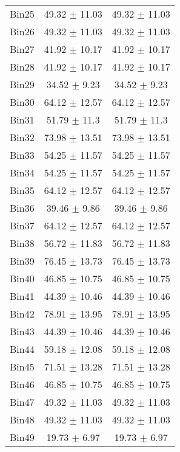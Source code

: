 \begin{tabular}{|c|c|c|}
     Bin25 & 49.32 $\pm$ 11.03 & 49.32 $\pm$ 11.03 \\ \cline{1-3} 
     Bin26 & 49.32 $\pm$ 11.03 & 49.32 $\pm$ 11.03 \\ \cline{1-3} 
     Bin27 & 41.92 $\pm$ 10.17 & 41.92 $\pm$ 10.17 \\ \cline{1-3} 
     Bin28 & 41.92 $\pm$ 10.17 & 41.92 $\pm$ 10.17 \\ \cline{1-3} 
     Bin29 & 34.52 $\pm$ 9.23 & 34.52 $\pm$ 9.23 \\ \cline{1-3} 
     Bin30 & 64.12 $\pm$ 12.57 & 64.12 $\pm$ 12.57 \\ \cline{1-3} 
     Bin31 & 51.79 $\pm$ 11.3 & 51.79 $\pm$ 11.3 \\ \cline{1-3} 
     Bin32 & 73.98 $\pm$ 13.51 & 73.98 $\pm$ 13.51 \\ \cline{1-3} 
     Bin33 & 54.25 $\pm$ 11.57 & 54.25 $\pm$ 11.57 \\ \cline{1-3} 
     Bin34 & 54.25 $\pm$ 11.57 & 54.25 $\pm$ 11.57 \\ \cline{1-3} 
     Bin35 & 64.12 $\pm$ 12.57 & 64.12 $\pm$ 12.57 \\ \cline{1-3} 
     Bin36 & 39.46 $\pm$ 9.86 & 39.46 $\pm$ 9.86 \\ \cline{1-3} 
     Bin37 & 64.12 $\pm$ 12.57 & 64.12 $\pm$ 12.57 \\ \cline{1-3} 
     Bin38 & 56.72 $\pm$ 11.83 & 56.72 $\pm$ 11.83 \\ \cline{1-3} 
     Bin39 & 76.45 $\pm$ 13.73 & 76.45 $\pm$ 13.73 \\ \cline{1-3} 
     Bin40 & 46.85 $\pm$ 10.75 & 46.85 $\pm$ 10.75 \\ \cline{1-3} 
     Bin41 & 44.39 $\pm$ 10.46 & 44.39 $\pm$ 10.46 \\ \cline{1-3} 
     Bin42 & 78.91 $\pm$ 13.95 & 78.91 $\pm$ 13.95 \\ \cline{1-3} 
     Bin43 & 44.39 $\pm$ 10.46 & 44.39 $\pm$ 10.46 \\ \cline{1-3} 
     Bin44 & 59.18 $\pm$ 12.08 & 59.18 $\pm$ 12.08 \\ \cline{1-3} 
     Bin45 & 71.51 $\pm$ 13.28 & 71.51 $\pm$ 13.28 \\ \cline{1-3} 
     Bin46 & 46.85 $\pm$ 10.75 & 46.85 $\pm$ 10.75 \\ \cline{1-3} 
     Bin47 & 49.32 $\pm$ 11.03 & 49.32 $\pm$ 11.03 \\ \cline{1-3} 
     Bin48 & 49.32 $\pm$ 11.03 & 49.32 $\pm$ 11.03 \\ \cline{1-3} 
     Bin49 & 19.73 $\pm$ 6.97 & 19.73 $\pm$ 6.97 \\ \cline{1-3} 

\end{tabular}
